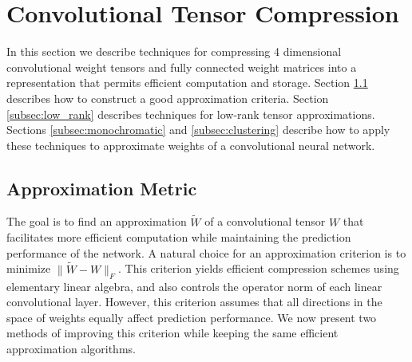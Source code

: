 \section{Convolutional Tensor Compression}\label{sec:approx_tech}
In this section we describe
techniques for compressing 
4 dimensional convolutional weight tensors and fully connected weight matrices into a representation that permits
efficient computation and storage. 
Section \ref{reconstr_sect} describes how to construct a good approximation 
criteria. Section \ref{subsec:low_rank} describes techniques for low-rank tensor
approximations. Sections \ref{subsec:monochromatic} and \ref{subsec:clustering} describe how to 
apply these techniques to approximate weights of a convolutional neural network.


\subsection{Approximation Metric}
\label{reconstr_sect}

The goal is to find an approximation $\tilde{W}$ of a convolutional tensor $W$ 
that facilitates more efficient computation while maintaining the prediction performance of the network.
A natural choice for an approximation criterion is
to minimize $\| \tilde{W} - W \|_F$. This criterion yields 
efficient compression schemes using elementary linear algebra, and also controls
the operator norm of each linear convolutional layer.
%
However, this criterion assumes that all directions in the space of weights equally 
affect prediction performance. We now present two methods of improving this criterion while 
keeping the same efficient approximation algorithms.

